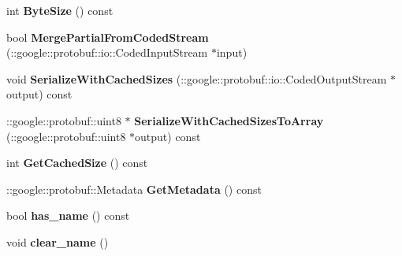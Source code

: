 \begin{DoxyCompactItemize}
\item 
\hypertarget{classSimpleChat_1_1UserListRequest_a226f6ed818edf08eef908be4fc07e0d1}{int {\bfseries Byte\-Size} () const }\label{classSimpleChat_1_1UserListRequest_a226f6ed818edf08eef908be4fc07e0d1}

\item 
\hypertarget{classSimpleChat_1_1UserListRequest_aabb1b42c320c44b6fe097e35c45f6f4d}{bool {\bfseries Merge\-Partial\-From\-Coded\-Stream} (\-::google\-::protobuf\-::io\-::\-Coded\-Input\-Stream $\ast$input)}\label{classSimpleChat_1_1UserListRequest_aabb1b42c320c44b6fe097e35c45f6f4d}

\item 
\hypertarget{classSimpleChat_1_1UserListRequest_a19e979aa2c6941a062031a6de6614057}{void {\bfseries Serialize\-With\-Cached\-Sizes} (\-::google\-::protobuf\-::io\-::\-Coded\-Output\-Stream $\ast$output) const }\label{classSimpleChat_1_1UserListRequest_a19e979aa2c6941a062031a6de6614057}

\item 
\hypertarget{classSimpleChat_1_1UserListRequest_af63977cae9aadb450b821d0c00036318}{\-::google\-::protobuf\-::uint8 $\ast$ {\bfseries Serialize\-With\-Cached\-Sizes\-To\-Array} (\-::google\-::protobuf\-::uint8 $\ast$output) const }\label{classSimpleChat_1_1UserListRequest_af63977cae9aadb450b821d0c00036318}

\item 
\hypertarget{classSimpleChat_1_1UserListRequest_a1ae199d9572780890df4bee08fef3959}{int {\bfseries Get\-Cached\-Size} () const }\label{classSimpleChat_1_1UserListRequest_a1ae199d9572780890df4bee08fef3959}

\item 
\hypertarget{classSimpleChat_1_1UserListRequest_adc8b33d4656f7522f94983067ca16b43}{\-::google\-::protobuf\-::\-Metadata {\bfseries Get\-Metadata} () const }\label{classSimpleChat_1_1UserListRequest_adc8b33d4656f7522f94983067ca16b43}

\item 
\hypertarget{classSimpleChat_1_1UserListRequest_ac39ea97fec23807d645941cd53bfa829}{bool {\bfseries has\-\_\-name} () const }\label{classSimpleChat_1_1UserListRequest_ac39ea97fec23807d645941cd53bfa829}

\item 
\hypertarget{classSimpleChat_1_1UserListRequest_a88fa57a473361057130a06c6800a4e44}{void {\bfseries clear\-\_\-name} ()}\label{classSimpleChat_1_1UserListRequest_a88fa57a473361057130a06c6800a4e44}


\end{DoxyCompactItemize}
